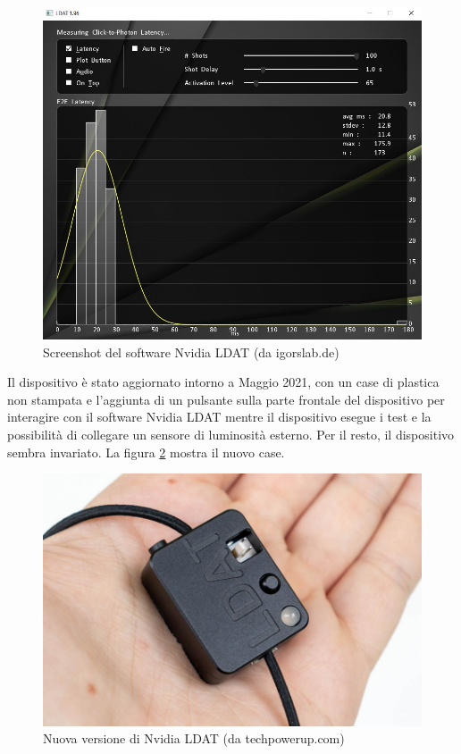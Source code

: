 \begin{figure}[h!]
	\centering
	\includegraphics[width=\textwidth]{StatoDellArte_files/nvldat_software.jpg}
	\caption{Screenshot del software Nvidia LDAT (da igorslab.de)}
	\label{fig:nvldat_software}
\end{figure}

Il dispositivo è stato aggiornato intorno a Maggio 2021, con un case di plastica non stampata e l'aggiunta di un pulsante sulla parte frontale del dispositivo per interagire con il software Nvidia LDAT mentre il dispositivo esegue i test e la possibilità di collegare un sensore di luminosità esterno. Per il resto, il dispositivo sembra invariato. La figura \ref{fig:nvldat_v2} mostra il nuovo case.

\begin{figure}[h!]
	\centering
	\includegraphics[width=\textwidth]{StatoDellArte_files/nvldat_v2.jpg}
	\caption{Nuova versione di Nvidia LDAT (da techpowerup.com)}
	\label{fig:nvldat_v2}
\end{figure}

